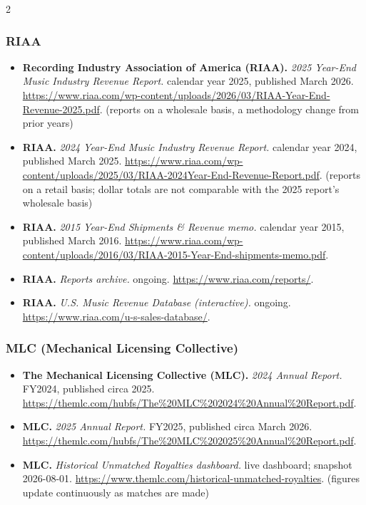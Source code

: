 {\begin{multicols}{2}
\subsubsection*{RIAA}
\begin{itemize}[itemsep=0pt,topsep=1pt,parsep=0pt,partopsep=0pt,leftmargin=1em]
\item \textbf{Recording Industry Association of America (RIAA).} \textit{2025 Year-End Music Industry Revenue Report.} calendar year 2025, published March 2026. \url{https://www.riaa.com/wp-content/uploads/2026/03/RIAA-Year-End-Revenue-2025.pdf}. {\color{ammuted}(reports on a wholesale basis, a methodology change from prior years)}
\item \textbf{RIAA.} \textit{2024 Year-End Music Industry Revenue Report.} calendar year 2024, published March 2025. \url{https://www.riaa.com/wp-content/uploads/2025/03/RIAA-2024Year-End-Revenue-Report.pdf}. {\color{ammuted}(reports on a retail basis; dollar totals are not comparable with the 2025 report’s wholesale basis)}
\item \textbf{RIAA.} \textit{2015 Year-End Shipments \& Revenue memo.} calendar year 2015, published March 2016. \url{https://www.riaa.com/wp-content/uploads/2016/03/RIAA-2015-Year-End-shipments-memo.pdf}.
\item \textbf{RIAA.} \textit{Reports archive.} ongoing. \url{https://www.riaa.com/reports/}.
\item \textbf{RIAA.} \textit{U.S. Music Revenue Database (interactive).} ongoing. \url{https://www.riaa.com/u-s-sales-database/}.
\end{itemize}
\subsubsection*{MLC (Mechanical Licensing Collective)}
\begin{itemize}[itemsep=0pt,topsep=1pt,parsep=0pt,partopsep=0pt,leftmargin=1em]
\item \textbf{The Mechanical Licensing Collective (MLC).} \textit{2024 Annual Report.} FY2024, published circa 2025. \url{https://themlc.com/hubfs/The%20MLC%202024%20Annual%20Report.pdf}.
\item \textbf{MLC.} \textit{2025 Annual Report.} FY2025, published circa March 2026. \url{https://themlc.com/hubfs/The%20MLC%202025%20Annual%20Report.pdf}.
\item \textbf{MLC.} \textit{Historical Unmatched Royalties dashboard.} live dashboard; snapshot 2026-08-01. \url{https://www.themlc.com/historical-unmatched-royalties}. {\color{ammuted}(figures update continuously as matches are made)}
\end{itemize}

\end{multicols}}
